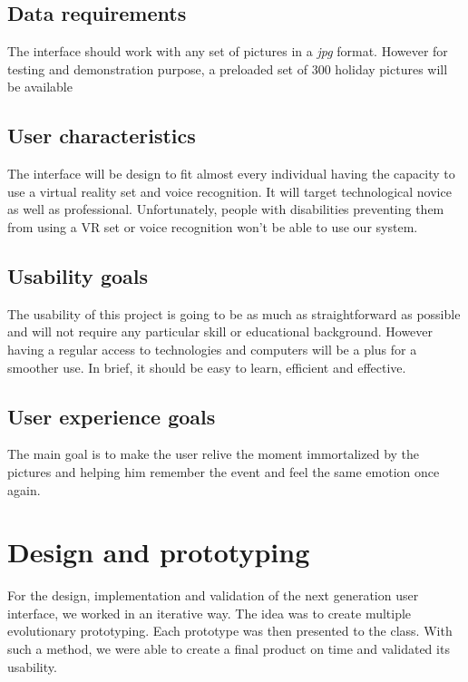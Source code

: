 \documentclass[11pt,a4paper]{article}
\begin{document}
\subsection{Data requirements}

The interface should work with any set of pictures in a \textit{jpg} format. However for testing and demonstration purpose, a preloaded set of 300 holiday pictures will be available

\subsection{User characteristics}

The interface will be design to fit almost every individual having the capacity to use a virtual reality set and voice recognition. It will target technological novice as well as professional. Unfortunately, people with disabilities preventing them from using a VR set or voice recognition won't be able to use our system.

\subsection{Usability goals}

The usability of this project is going to be as much as straightforward as possible and will not require any particular skill or educational background. However having a regular access to technologies and computers will be a plus for a smoother use. In brief, it should be easy to learn, efficient and effective.

\subsection{User experience goals}

The main goal is to make the user relive the moment immortalized by the pictures and helping him remember the event and feel the same emotion once again. %

\section{Design and prototyping}

For the design, implementation and validation of the next generation user interface, we worked in an iterative way.
The idea was to create multiple evolutionary prototyping. Each prototype was then presented to the class. With such a method, we were able to create a final product on time and validated its usability.
\end{document}

